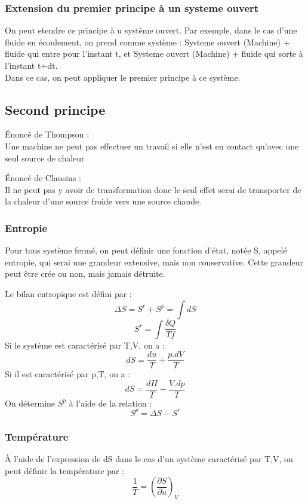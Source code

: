 \subsubsection{Extension du premier principe à un systeme ouvert}
\begin{prop}
On peut etendre ce principe à u système ouvert. Par exemple, dans le cas d'une fluide en écoulement, on prend comme système : Systeme ouvert (Machine) + fluide qui entre pour l'instant t, et Systeme ouvert (Machine) + fluide qui sorte à l'instant t+dt.\\
Dans ce cas, on peut appliquer le premier principe à ce système.
\end{prop}

\subsection{Second principe}
\begin{enon}
Énoncé de Thompson :\\ 
Une machine ne peut pas effectuer un travail si elle n'est en contact qu'avec une seul source de chaleur
\end{enon}
\begin{enon}
Énoncé de Clausius :\\
Il ne peut pas y avoir de transformation donc le seul effet serai de transporter de la chaleur d'une source froide vers une source chaude.
\end{enon}
\subsubsection{Entropie}
\begin{enon}
Pour tous système fermé, on peut définir une fonction d'état, notée S, appelé entropie, qui serai une grandeur extensive, mais non conservative. Cette grandeur peut être crée ou non, mais jamais détruite.
\end{enon}
\begin{de}
Le bilan entropique est défini par :
$$\Delta S = S^{r}+S^{p}=\int dS$$
$$S^{r}=\int \dfrac{\delta Q}{Tf}$$
Si le système est caractérisé par T,V, on a :
$$dS = \dfrac{du}{T}+\dfrac{p.dV}{T}$$
Si il est caractérisé par p,T, on a :
$$dS = \dfrac{dH}{T}-\dfrac{V.dp}{T}$$
On détermine $S^{p}$ à l'aide de la relation :
$$S^{p} = \Delta S - S^{r}$$
\end{de}
\subsubsection{Température}
À l'aide de l'expression de dS dans le cas d'un système caractérisé par T,V, on peut définir la température par : 
$$\dfrac{1}{T} = \left(\dfrac{\partial S}{\partial u}\right)_V$$
